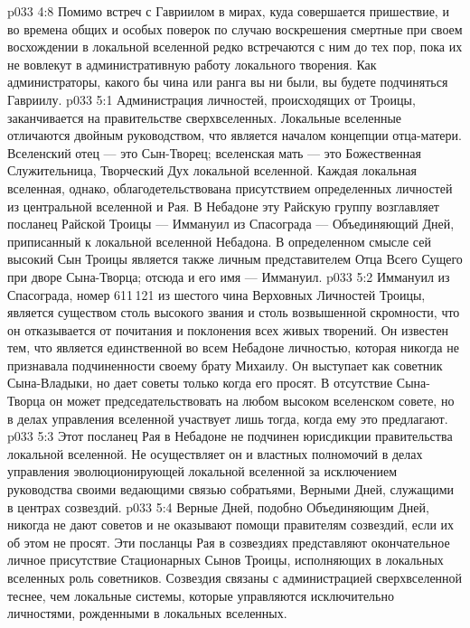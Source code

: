 \vs p033 4:8 Помимо встреч с Гавриилом в мирах, куда совершается пришествие, и во времена общих и особых поверок по случаю воскрешения смертные при своем восхождении в локальной вселенной редко встречаются с ним до тех пор, пока их не вовлекут в административную работу локального творения. Как администраторы, какого бы чина или ранга вы ни были, вы будете подчиняться Гавриилу.
\vs p033 5:1 Администрация личностей, происходящих от Троицы, заканчивается на правительстве сверхвселенных. Локальные вселенные отличаются двойным руководством, что является началом концепции отца\hyp{}матери. Вселенский отец --- это Сын\hyp{}Творец; вселенская мать --- это Божественная Служительница, Творческий Дух локальной вселенной. Каждая локальная вселенная, однако, облагодетельствована присутствием определенных личностей из центральной вселенной и Рая. В Небадоне эту Райскую группу возглавляет посланец Райской Троицы --- Иммануил из Спасограда --- Объединяющий Дней, приписанный к локальной вселенной Небадона. В определенном смысле сей высокий Сын Троицы является также личным представителем Отца Всего Сущего при дворе Сына\hyp{}Творца; отсюда и его имя --- Иммануил.
\vs p033 5:2 Иммануил из Спасограда, номер 611\,121 из шестого чина Верховных Личностей Троицы, является существом столь высокого звания и столь возвышенной скромности, что он отказывается от почитания и поклонения всех живых творений. Он известен тем, что является единственной во всем Небадоне личностью, которая никогда не признавала подчиненности своему брату Михаилу. Он выступает как советник Сына\hyp{}Владыки, но дает советы только когда его просят. В отсутствие Сына\hyp{}Творца он может председательствовать на любом высоком вселенском совете, но в делах управления вселенной участвует лишь тогда, когда ему это предлагают.
\vs p033 5:3 Этот посланец Рая в Небадоне не подчинен юрисдикции правительства локальной вселенной. Не осуществляет он и властных полномочий в делах управления эволюционирующей локальной вселенной за исключением руководства своими ведающими связью собратьями, Верными Дней, служащими в центрах созвездий.
\vs p033 5:4 Верные Дней, подобно Объединяющим Дней, никогда не дают советов и не оказывают помощи правителям созвездий, если их об этом не просят. Эти посланцы Рая в созвездиях представляют окончательное личное присутствие Стационарных Сынов Троицы, исполняющих в локальных вселенных роль советников. Созвездия связаны с администрацией сверхвселенной теснее, чем локальные системы, которые управляются исключительно личностями, рожденными в локальных вселенных.
